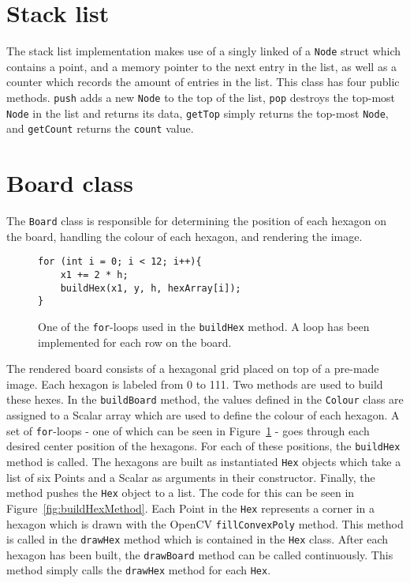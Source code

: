 \section{Stack list}
The stack list implementation makes use of a singly linked of a \texttt{Node} struct which contains a point, and a memory pointer to the next entry in the list, as well as a counter which records the amount of entries in the list. This class has four public methods. \texttt{push} adds a new \texttt{Node} to the top of the list, \texttt{pop} destroys the top-most \texttt{Node} in the list and returns its data, \texttt{getTop} simply returns the top-most \texttt{Node}, and \texttt{getCount} returns the \texttt{count} value.


\section{Board class}
The \texttt{Board} class is responsible for determining the position of each hexagon on the board, handling the colour of each hexagon, and rendering the image. 

\begin{figure}
\begin{lstlisting}
for (int i = 0; i < 12; i++){
	x1 += 2 * h;
	buildHex(x1, y, h, hexArray[i]);
}
\end{lstlisting}
\caption{One of the \texttt{for}-loops used in the \texttt{buildHex} method. A loop has been implemented for each row on the board. \label{fig:buildHexForLoop}}
\end{figure}

The rendered board consists of a hexagonal grid placed on top of a pre-made image. Each hexagon is labeled from 0 to 111. Two methods are used to build these hexes. In the \texttt{buildBoard} method, the values defined in the \texttt{Colour} class are assigned to a Scalar array which are used to define the colour of each hexagon. A set of \texttt{for}-loops - one of which can be seen in Figure~\ref{fig:buildHexForLoop} - goes through each desired center position of the hexagons. For each of these positions, the \texttt{buildHex} method is called. The hexagons are built as instantiated \texttt{Hex} objects which take a list of six Points and a Scalar as arguments in their constructor. Finally, the method pushes the \texttt{Hex} object to a list. The code for this can be seen in Figure~\ref{fig:buildHexMethod}. Each Point in the \texttt{Hex} represents a corner in a hexagon which is drawn with the OpenCV \texttt{fillConvexPoly} method. This method is called in the \texttt{drawHex} method which is contained in the \texttt{Hex} class. After each hexagon has been built, the \texttt{drawBoard} method can be called continuously. This method simply calls the \texttt{drawHex} method for each \texttt{Hex}.

